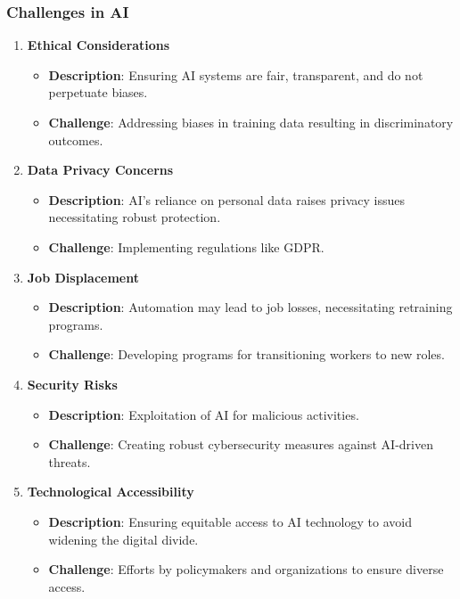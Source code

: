 \documentclass[aspectratio=169]{beamer}
\begin{document}
\begin{frame}[fragile]
    \frametitle{Challenges in AI}
    \begin{enumerate}
        \item \textbf{Ethical Considerations}
            \begin{itemize}
                \item \textbf{Description}: Ensuring AI systems are fair, transparent, and do not perpetuate biases.
                \item \textbf{Challenge}: Addressing biases in training data resulting in discriminatory outcomes.
            \end{itemize}
        \item \textbf{Data Privacy Concerns}
            \begin{itemize}
                \item \textbf{Description}: AI's reliance on personal data raises privacy issues necessitating robust protection.
                \item \textbf{Challenge}: Implementing regulations like GDPR.
            \end{itemize}
        \item \textbf{Job Displacement}
            \begin{itemize}
                \item \textbf{Description}: Automation may lead to job losses, necessitating retraining programs.
                \item \textbf{Challenge}: Developing programs for transitioning workers to new roles.
            \end{itemize}
        \item \textbf{Security Risks}
            \begin{itemize}
                \item \textbf{Description}: Exploitation of AI for malicious activities.
                \item \textbf{Challenge}: Creating robust cybersecurity measures against AI-driven threats.
            \end{itemize}
        \item \textbf{Technological Accessibility}
            \begin{itemize}
                \item \textbf{Description}: Ensuring equitable access to AI technology to avoid widening the digital divide.
                \item \textbf{Challenge}: Efforts by policymakers and organizations to ensure diverse access.
            \end{itemize}
    \end{enumerate}
\end{frame}
\end{document}
